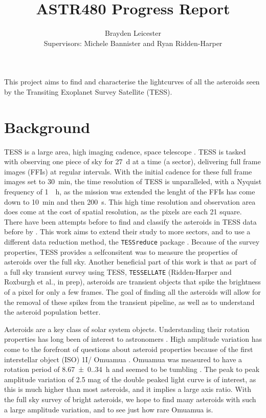 \documentclass[12pt]{article}
\title{ASTR480 Progress Report}
\author{Brayden Leicester \\[1ex]
\small{Supervisors: Michele Bannister and Ryan Ridden-Harper}
}
\DeclareRobustCommand{\okina}{%
  \raisebox{\dimexpr\fontcharht\font`A-\height}{%
    \scalebox{0.8}{`}%
  }%
}
\newcommand{\omuamua}{\okina Omuamua }
\begin{document}
\maketitle


This project aims to find and characterise the lightcurves of all the asteroids seen by the Transiting Exoplanet Survey Satellite (TESS). 
\section{Background}
TESS is a large area, high imaging cadence, space telescope  \citep{Ricker2014}. 
TESS is tasked with observing one piece of sky for \qty{27}{\day} at a time (a sector), delivering  full frame images (FFIs) at regular intervals. 
With the initial cadence for these full frame images set to \qty{30}{\minute}, the time resolution of TESS is unparalleled, with a Nyquist frequency of \qty{1}{\per\hour}, as the mission was extended the lenght of the FFIs has come down to \qty{10}{\minute} and then \qty{200}{\second}. 
This high time resolution and observation area does come at the cost of spatial resolution, as the pixels are each \qty{21}{\arcsec} square.
There have been attempts before to find and classify the asteroids in TESS data before by \citet{Pal2018, Pal2020}. This work aims to extend their study to more sectors, and to use a different data reduction method, the \texttt{TESSreduce} package \citep{Ridden-Harper2021}.
Because of the survey properties, TESS provides a selfconsitent was to measure the properties of asteroids over the full sky.   
Another beneficial part of this work is that as part of a full sky transient survey using TESS, \texttt{TESSELLATE} (Ridden-Harper and Roxburgh et al., in prep), asteroids are transient objects that spike the brightness of a pixel for only a few frames.
The goal of finding all the asteroids will allow for the removal of these spikes from the transient pipeline, as well as to understand the asteroid population better.  


Asteroids are a key class of solar system objects. 
Understanding their rotation properties has long been of interest to astronomers \citep[e.g.][]{Weidenschilling1981,Harris1994}. %
High amplitude variation has come to the forefront of questions about asteroid properties because of the first interstellar object (ISO) 1I/\omuamua \citep[see][for a review]{Bannister2019}. 
\omuamua was measured to have a rotation period of \qty{8.67(0.34)}{\hour} \citep{Belton2018} and seemed to be tumbling \citep[e.g.][]{Drahus2018,Fraser2018}. 
The peak to peak amplitude variation of 2.5 mag \citep{Meech2017} of the double peaked light curve is of interest, as this is much higher than most asteroids, and it implies a large axis ratio. 
With the full sky survey of bright asteroids, we hope to find many asteroids with such a large amplitude variation, and to see just how rare \omuamua is.  
\end{document}
